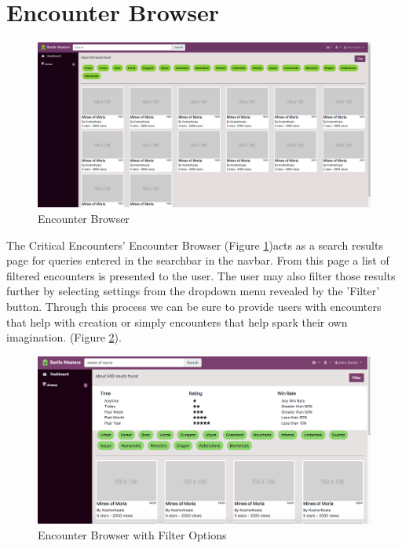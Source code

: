 \documentclass[12pt,a4paper]{report}
\begin{document}
	\section{Encounter Browser}
	\begin{figure}[!h]
		\centering
		\includegraphics[scale=.20]{search}
		\caption{Encounter Browser}
		\label{fig: Encounter Browser}
	\end{figure}
	The Critical Encounters' Encounter Browser (Figure \ref{fig: Encounter Browser})acts as a search results page for queries entered in the searchbar in the navbar. From this page a list of filtered encounters is presented to the user. The user may also filter those results further by selecting settings from the dropdown menu revealed by the 'Filter' button. Through this process we can be sure to provide users with encounters that help with creation or simply encounters that help spark their own imagination. (Figure \ref{fig: Encounter Browser with Filter Options}).
	\begin{figure}[!h]
		\centering
		\includegraphics[scale=.27]{search_filtered}
		\caption{Encounter Browser with Filter Options}
		\label{fig: Encounter Browser with Filter Options}	
	\end{figure}
	\newpage
\end{document}
